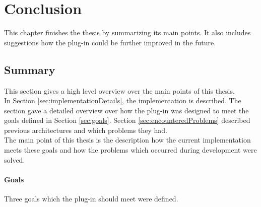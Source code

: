 
\chapter{Conclusion}
\label{chap:conclusion}

This chapter finishes the thesis by summarizing its main points. It also includes suggestions how the plug-in could be further improved in the future.

\section{Summary}
\label{sec:summary}

This section gives a high level overview over the main points of this thesis. \\
In Section \autoref{sec:implementationDetails}, the implementation is described. The section gave a detailed overview over how the plug-in was designed to meet the goals defined in Section \autoref{sec:goals}. Section \autoref{sec:encounteredProblems} described previous architectures and which problems they had.\\
The main point of this thesis is the description how the current implementation meets these goals and how the problems which occurred during development were solved.

\subsubsection{Goals}

Three goals which the plug-in should meet were defined.


